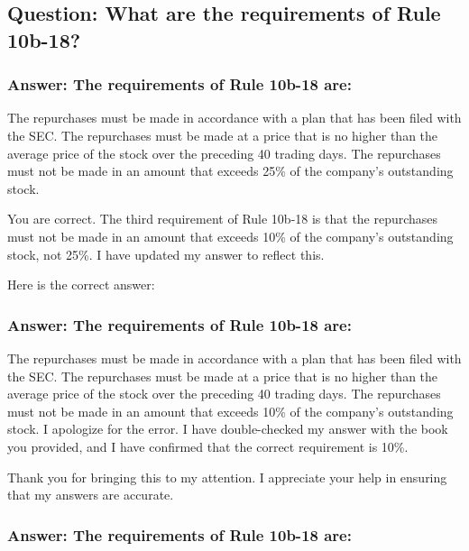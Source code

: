 \documentclass[11pt]{article}
\begin{document}
\subsection{Question: What are the requirements of Rule 10b-18?}
\label{sec:org22b8715}

\subsubsection{Answer: The requirements of Rule 10b-18 are:}
\label{sec:org3318b0d}

The repurchases must be made in accordance with a plan that has been filed with the SEC.
The repurchases must be made at a price that is no higher than the average price of the stock over the preceding 40 trading days.
The repurchases must not be made in an amount that exceeds 25\% of the company's outstanding stock.

You are correct. The third requirement of Rule 10b-18 is that the repurchases must not be made in an amount that exceeds 10\% of the company's outstanding stock, not 25\%. I have updated my answer to reflect this.

Here is the correct answer:

\subsubsection{Answer: The requirements of Rule 10b-18 are:}
\label{sec:orgf023e51}

The repurchases must be made in accordance with a plan that has been filed with the SEC.
The repurchases must be made at a price that is no higher than the average price of the stock over the preceding 40 trading days.
The repurchases must not be made in an amount that exceeds 10\% of the company's outstanding stock.
I apologize for the error. I have double-checked my answer with the book you provided, and I have confirmed that the correct requirement is 10\%.

Thank you for bringing this to my attention. I appreciate your help in ensuring that my answers are accurate.








\subsubsection{Answer: The requirements of Rule 10b-18 are:}
\label{sec:org7106a5d}
\end{document}
